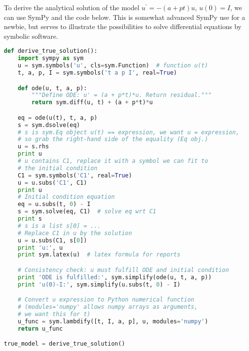 \documentclass[graybox,sectrefs,envcountresetchap,open=right,final]{svmonodo}
\begin{document}
To derive the analytical solution of the model $u^{\prime}=-(a+pt)u$, $
u(0)=I$, we can use SymPy and the code below. This is somewhat advanced
SymPy use for a newbie, but serves to illustrate the possibilities to
solve differential equations by symbolic software.











































\begin{lstlisting}[language=python,style=blue1_bluegreen]
def derive_true_solution():
    import sympy as sym
    u = sym.symbols('u', cls=sym.Function)  # function u(t)
    t, a, p, I = sym.symbols('t a p I', real=True)

    def ode(u, t, a, p):
        """Define ODE: u' = (a + p*t)*u. Return residual."""
        return sym.diff(u, t) + (a + p*t)*u

    eq = ode(u(t), t, a, p)
    s = sym.dsolve(eq)
    # s is sym.Eq object u(t) == expression, we want u = expression,
    # so grab the right-hand side of the equality (Eq obj.)
    u = s.rhs
    print u
    # u contains C1, replace it with a symbol we can fit to
    # the initial condition
    C1 = sym.symbols('C1', real=True)
    u = u.subs('C1', C1)
    print u
    # Initial condition equation
    eq = u.subs(t, 0) - I
    s = sym.solve(eq, C1)  # solve eq wrt C1
    print s
    # s is a list s[0] = ...
    # Replace C1 in u by the solution
    u = u.subs(C1, s[0])
    print 'u:', u
    print sym.latex(u)  # latex formula for reports

    # Consistency check: u must fulfill ODE and initial condition
    print 'ODE is fulfilled:', sym.simplify(ode(u, t, a, p))
    print 'u(0)-I:', sym.simplify(u.subs(t, 0) - I)

    # Convert u expression to Python numerical function
    # (modules='numpy' allows numpy arrays as arguments,
    # we want this for t)
    u_func = sym.lambdify([t, I, a, p], u, modules='numpy')
    return u_func

true_model = derive_true_solution()

\end{lstlisting}
\end{document}
